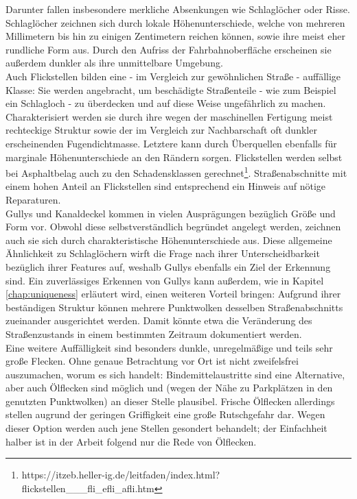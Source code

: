 Darunter fallen insbesondere merkliche Absenkungen wie Schlaglöcher oder Risse. Schlaglöcher zeichnen sich durch lokale Höhenunterschiede, welche von mehreren Millimetern bis hin zu einigen Zentimetern reichen können, sowie ihre meist eher rundliche Form aus. Durch den Aufriss der Fahrbahnoberfläche erscheinen sie außerdem dunkler als ihre unmittelbare Umgebung. \\
Auch Flickstellen bilden eine - im Vergleich zur gewöhnlichen Straße - auffällige Klasse: Sie werden angebracht, um beschädigte Straßenteile - wie zum Beispiel ein Schlagloch - zu überdecken und auf diese Weise ungefährlich zu machen. Charakterisiert werden sie durch ihre wegen der maschinellen Fertigung meist rechteckige Struktur sowie der im Vergleich zur Nachbarschaft oft dunkler erscheinenden Fugendichtmasse. Letztere kann durch Überquellen ebenfalls für marginale Höhenunterschiede an den Rändern sorgen. Flickstellen werden selbst bei Asphaltbelag auch zu den Schadensklassen gerechnet\footnote{https://itzeb.heller-ig.de/leitfaden/index.html?flickstellen\_\_\_fli\_efli\_afli.htm}. Straßenabschnitte mit einem hohen Anteil an Flickstellen sind entsprechend ein Hinweis auf nötige Reparaturen. \\
Gullys und Kanaldeckel kommen in vielen Ausprägungen bezüglich Größe und Form vor. Obwohl diese selbstverständlich begründet angelegt werden, zeichnen auch sie sich durch charakteristische Höhenunterschiede aus. Diese allgemeine Ähnlichkeit zu Schlaglöchern wirft die Frage nach ihrer Unterscheidbarkeit bezüglich ihrer Features auf, weshalb Gullys ebenfalls ein Ziel der Erkennung sind. Ein zuverlässiges Erkennen von Gullys kann außerdem, wie in Kapitel \ref{chap:uniqueness} erläutert wird, einen weiteren Vorteil bringen: Aufgrund ihrer beständigen Struktur können mehrere Punktwolken desselben Straßenabschnitts zueinander ausgerichtet werden. Damit könnte etwa die Veränderung des Straßenzustands in einem bestimmten Zeitraum dokumentiert werden. \\
Eine weitere Auffälligkeit sind besonders dunkle, unregelmäßige und teils sehr große Flecken. Ohne genaue Betrachtung vor Ort ist nicht zweifelsfrei auszumachen, worum es sich handelt: Bindemittelaustritte sind eine Alternative, aber auch Ölflecken sind möglich und (wegen der Nähe zu Parkplätzen in den genutzten Punktwolken) an dieser Stelle plausibel. Frische Ölflecken allerdings stellen augrund der geringen Griffigkeit eine große Rutschgefahr dar. Wegen dieser Option werden auch jene Stellen gesondert behandelt; der Einfachheit halber ist in der Arbeit folgend nur die Rede von Ölflecken. \\
